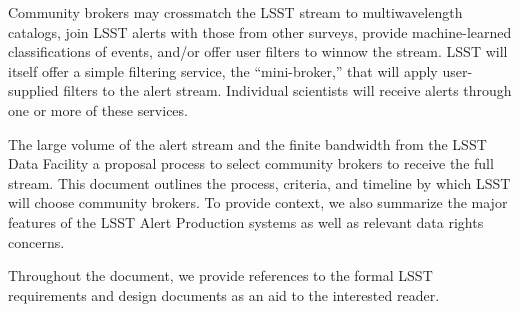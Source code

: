 Community brokers may crossmatch the LSST stream to multiwavelength catalogs, join LSST alerts with those from other surveys, provide machine-learned classifications of events, and/or offer user filters to winnow the stream.
LSST will itself offer a simple filtering service, the ``mini-broker,'' that will apply user-supplied filters to the alert stream.
Individual scientists will receive alerts through one or more of these services.

The large volume of the alert stream and the finite bandwidth from the LSST Data Facility   a proposal process to select community brokers to receive the full stream.
This document outlines the process, criteria, and timeline by which LSST will choose community brokers.
To provide context, we also summarize the major features of the LSST Alert Production systems as well as relevant data rights concerns.

Throughout the document, we provide references to the formal LSST requirements and design documents as an aid to the interested reader.
